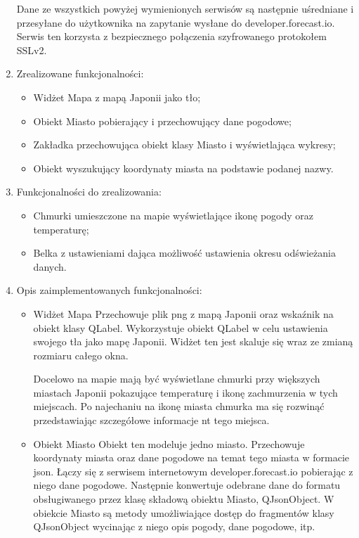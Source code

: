 \documentclass[a4paper]{article}
\begin{document}
\begin{enumerate}
Dane ze wszystkich powyżej wymienionych serwisów są następnie uśredniane i przesyłane do użytkownika na zapytanie wysłane do developer.forecast.io. Serwis ten korzysta z bezpiecznego połączenia szyfrowanego protokołem SSLv2.


\item Zrealizowane funkcjonalności:
\begin{itemize}
\item Widżet Mapa z mapą Japonii jako tło;
\item Obiekt Miasto pobierający i przechowujący dane pogodowe;
\item Zakładka przechowująca obiekt klasy Miasto i wyświetlająca wykresy;
\item Obiekt wyszukujący koordynaty miasta na podstawie podanej nazwy.
\end{itemize}

\item Funkcjonalności do zrealizowania:
\begin{itemize}
\item Chmurki umieszczone na mapie wyświetlające ikonę pogody oraz temperaturę;
\item Belka z ustawieniami dająca możliwość ustawienia okresu odświeżania danych.
\end{itemize}

\item Opis zaimplementowanych funkcjonalności:
\begin{itemize}

\item Widżet Mapa
Przechowuje plik png z mapą Japonii oraz wskaźnik na obiekt klasy QLabel. Wykorzystuje obiekt QLabel w celu ustawienia swojego tła jako mapę Japonii. Widżet ten jest skaluje się wraz ze zmianą rozmiaru całego okna.

Docelowo na mapie mają być wyświetlane chmurki przy większych miastach Japonii pokazujące temperaturę i ikonę zachmurzenia w tych miejscach. Po najechaniu na ikonę miasta chmurka ma się rozwinąć przedstawiając szczegółowe informacje nt tego miejsca.

\item Obiekt Miasto
Obiekt ten modeluje jedno miasto. Przechowuje koordynaty miasta oraz dane pogodowe na temat tego miasta w formacie json. Łączy się z serwisem internetowym developer.forecast.io pobierając z niego dane pogodowe. Następnie konwertuje odebrane dane do formatu obsługiwanego przez klasę składową obiektu Miasto, QJsonObject.
W obiekcie Miasto są metody umożliwiające dostęp do fragmentów klasy QJsonObject wycinając z niego opis pogody, dane pogodowe, itp.


\end{itemize}
\end{enumerate}
\end{document}
